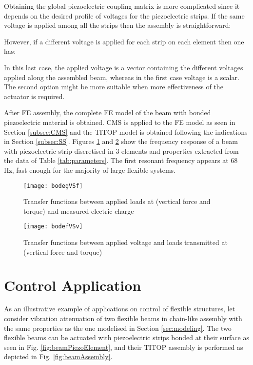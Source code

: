 \documentclass{ifacconf}
\begin{document}
Obtaining the global piezoelectric coupling matrix is more complicated since it depends on the desired profile of voltages for the piezoelectric strips. If the same voltage is applied among all the strips then the assembly is straightforward:





However, if a different voltage is applied for each strip on each element then one has:





In this last case, the applied voltage is a vector containing the different voltages applied along the assembled beam, whereas in the first case voltage is a scalar. The second option might be more suitable when more effectiveness of the actuator is required.

After FE assembly, the complete FE model of the beam with bonded piezoelectric material is obtained. CMS is applied to the FE model as seen in Section \ref{subsec:CMS} and the TITOP model is obtained following the indications in Section \ref{subsec:SS}.  Figures \ref{fig:gVSv} and \ref{fig:gVSm} show the frequency response of a beam with piezoelectric strip discretised in 3 elements and properties extracted from the data of Table \ref{tab:parameters}. The first resonant frequency appears at 68 Hz, fast enough for the majority of large flexible systems. 

\begin{figure} 
\center
\texttt{[image: bodegVSf]}
\caption{Transfer functions between applied loads at  (vertical force and torque) and measured electric charge}
\label{fig:gVSv}
\end{figure}

\begin{figure} 
\center
\texttt{[image: bodefVSv]}
\caption{Transfer functions between applied voltage and loads transmitted at  (vertical force and torque)}
\label{fig:gVSm}
\end{figure}




\section{Control Application}
\label{sec:control}

As an illustrative example of applications on control of flexible structures, let consider vibration attenuation of two flexible beams in chain-like assembly with the same properties as the one modelised in Section \ref{sec:modeling}. The two flexible beams can be actuated with piezoelectric strips bonded at their surface as seen in Fig. \ref{fig:beamPiezoElement}, and their TITOP assembly is performed as depicted in Fig. \ref{fig:beamAssembly}.
\end{document}

